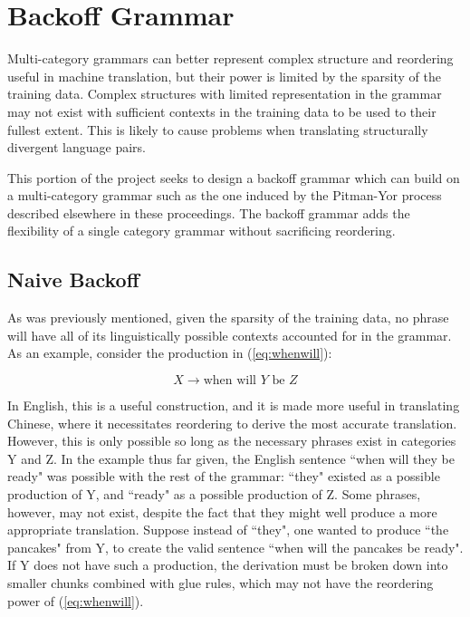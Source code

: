 
\maketitle

\section{Backoff Grammar}

Multi-category grammars can better represent complex structure and reordering useful in machine translation, but their power is limited by the sparsity of the training data.  Complex structures with limited representation in the grammar may not exist with sufficient contexts in the training data to be used to their fullest extent.  This is likely to cause problems when translating structurally divergent language pairs.

This portion of the project seeks to design a backoff grammar which can build on a multi-category grammar such as the one induced by the Pitman-Yor process described elsewhere in these proceedings.  The backoff grammar adds the flexibility of a single category grammar without sacrificing reordering.

\subsection{Naive Backoff}

As was previously mentioned, given the sparsity of the training data, no phrase will have all of its linguistically possible contexts accounted for in the grammar.  As an example, consider the production in (\ref{eq:whenwill}):

\begin{equation}\label{eq:whenwill}
X \rightarrow \text{when will }Y\text{ be }Z
\end{equation}

In English, this is a useful construction, and it is made more useful in translating Chinese, where it necessitates reordering to derive the most accurate translation.  However, this is only possible so long as the necessary phrases exist in categories Y and Z.  In the example thus far given, the English sentence ``when will they be ready" was possible with the rest of the grammar: ``they" existed as a possible production of Y, and ``ready" as a possible production of Z.  Some phrases, however, may not exist, despite the fact that they might well produce a more appropriate translation.  Suppose instead of ``they", one wanted to produce ``the pancakes" from Y, to create the valid sentence ``when will the pancakes be ready".  If Y does not have such a production, the derivation must be broken down into smaller chunks combined with glue rules, which may not have the reordering power of (\ref{eq:whenwill}).

